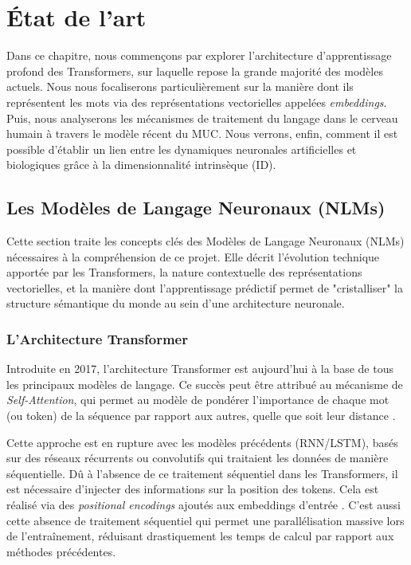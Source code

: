 \chapter{État de l'art}
\label{chap:etat_art}

Dans ce chapitre, nous commençons par explorer l’architecture d’apprentissage profond des Transformers, sur laquelle repose la grande majorité des modèles actuels. Nous nous focaliserons particulièrement sur la manière dont ils représentent les mots via des représentations vectorielles appelées \textit{embeddings}. Puis, nous analyserons les mécanismes de traitement du langage dans le cerveau humain à travers le modèle récent du MUC. Nous verrons, enfin, comment il est possible d'établir un lien entre les dynamiques neuronales artificielles et biologiques grâce à la dimensionnalité intrinsèque (ID).

\section{Les Modèles de Langage Neuronaux (NLMs)}
Cette section traite les concepts clés des Modèles de Langage Neuronaux (NLMs) nécessaires à la compréhension de ce projet. Elle décrit l’évolution technique apportée par les Transformers, la nature contextuelle des représentations vectorielles, et la manière dont l'apprentissage prédictif permet de "cristalliser" la structure sémantique du monde au sein d'une architecture neuronale.

\subsection{L'Architecture Transformer}
Introduite en 2017, l’architecture Transformer est aujourd’hui à la base de tous les principaux modèles de langage. Ce succès peut être attribué au mécanisme de \textit{Self-Attention}, qui permet au modèle de pondérer l'importance de chaque mot (ou token) de la séquence par rapport aux autres, quelle que soit leur distance \cite{vaswani2017attention}.

Cette approche est en rupture avec les modèles précédents (RNN/LSTM), basés sur des réseaux récurrents ou convolutifs qui traitaient les données de manière séquentielle. Dû à l’absence de ce traitement séquentiel dans les Transformers, il est nécessaire d’injecter des informations sur la position des tokens. Cela est réalisé via des \textit{positional encodings} ajoutés aux embeddings d’entrée \cite{vaswani2017attention}. C’est aussi cette absence de traitement séquentiel qui permet une parallélisation massive lors de l’entraînement, réduisant drastiquement les temps de calcul par rapport aux méthodes précédentes.

